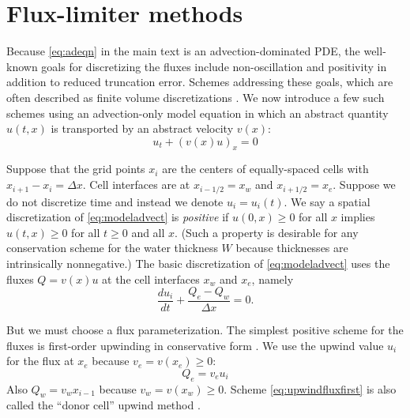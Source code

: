 \documentclass[11pt,final]{amsart}
\begin{document}
\section{Flux-limiter methods} \label{app:fluxlimiters}

Because \eqref{eq:adeqn} in the main text is an advection-dominated PDE, the well-known goals for discretizing the fluxes include non-oscillation and positivity \citep{HundsdorferVerwer2010} in addition to reduced truncation error.  Schemes addressing these goals, which are often described as finite volume discretizations \citep{LeVeque}.  We now introduce a few such schemes using an advection-only model equation in which an abstract quantity $u(t,x)$ is transported by an abstract velocity $v(x)$:
\begin{equation} \label{eq:modeladvect}
u_t + (v(x) u)_x = 0
\end{equation}

Suppose that the grid points $x_i$ are the centers of equally-spaced cells with $x_{i+1}-x_i=\Delta x$.  Cell interfaces are at $x_{i-1/2}=x_w$ and $x_{i+1/2}=x_e$.  Suppose we do not discretize time and instead we denote $u_i=u_i(t)$.  We say a spatial discretization of \eqref{eq:modeladvect} is \emph{positive} if $u(0,x)\ge 0$ for all $x$ implies $u(t,x)\ge 0$ for all $t\ge 0$ and all $x$.  (Such a property is desirable for any conservation scheme for the water thickness $W$ because thicknesses are intrinsically nonnegative.)  The basic discretization of \eqref{eq:modeladvect} uses the fluxes $Q=v(x) u$ at the cell interfaces $x_w$ and $x_e$, namely
\begin{equation}
\frac{du_i}{dt} + \frac{Q_e - Q_w}{\Delta x} = 0. \label{eq:basicmodelFD}
\end{equation}

But we must choose a flux parameterization.  The simplest positive scheme for the fluxes is first-order upwinding in conservative form \citep[section I.4.3]{HundsdorferVerwer2010}.  We use the upwind value $u_i$ for the flux at $x_e$ because $v_e = v(x_e) \ge 0$:
\begin{equation}
Q_e = v_e u_i \label{eq:upwindfluxfirst}
\end{equation}
Also $Q_w = v_w x_{i-1}$ because $v_w = v(x_w) \ge 0$.  Scheme \eqref{eq:upwindfluxfirst} is also called the ``donor cell'' upwind method \citep{LeVeque}.
\end{document}

